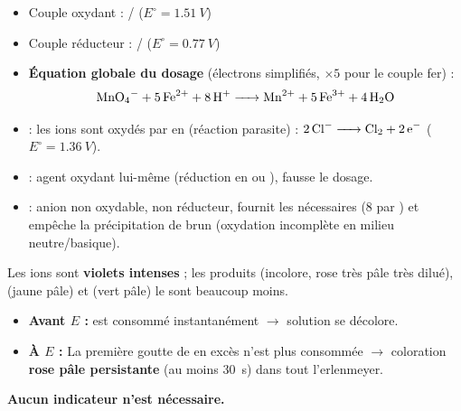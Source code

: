 \documentclass[11pt]{article}
\begin{document}
\begin{propriete}
\begin{itemize}
\item Couple oxydant : / \quad {} \quad ($E^\circ = \SI{+1,51}{V}$)
\item Couple réducteur : / \quad {} \quad ($E^\circ = \SI{+0,77}{V}$)
\item \textbf{Équation globale du dosage} (électrons simplifiés, $\times 5$ pour le couple fer) :
\[ \ce{MnO4- + 5Fe^2+ + 8H+ -> Mn^2+ + 5Fe^3+ + 4H2O} \]
\end{itemize}
\end{propriete}

\begin{attention}
\begin{itemize}
\item {} : les ions  sont oxydés par  en  (réaction parasite) : $\ce{2Cl- -> Cl2 + 2e-}$ ($E^\circ = \SI{+1,36}{V}$).
\item {} : agent oxydant lui-même (réduction en  ou ), fausse le dosage.
\item {} : anion  non oxydable, non réducteur, fournit les  nécessaires (8 par ) et empêche la précipitation de  brun (oxydation incomplète en milieu neutre/basique).
\end{itemize}
\end{attention}

\begin{aretenir}
Les ions  sont \textbf{violets intenses} ; les produits  (incolore, rose très pâle très dilué),  (jaune pâle) et  (vert pâle) le sont beaucoup moins.
\begin{itemize}
\item \textbf{Avant $E$ :}  est consommé instantanément $\rightarrow$ solution se décolore.
\item \textbf{À $E$ :} La première goutte de  en excès n'est plus consommée $\rightarrow$ coloration \textbf{rose pâle persistante} (au moins \SI{30}{s}) dans tout l'erlenmeyer.
\end{itemize}
\textbf{Aucun indicateur n'est nécessaire.}
\end{aretenir}
\end{document}
